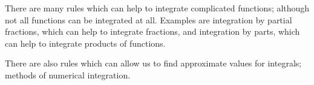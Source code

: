 There are many rules which can help to integrate complicated functions;
although not all functions can be integrated at all. Examples
are integration by partial fractions, which can help to integrate
fractions, and integration by parts, which can help to integrate
products of functions.
\par
There are also rules which can allow us to find approximate values 
for integrals; methods of numerical integration.